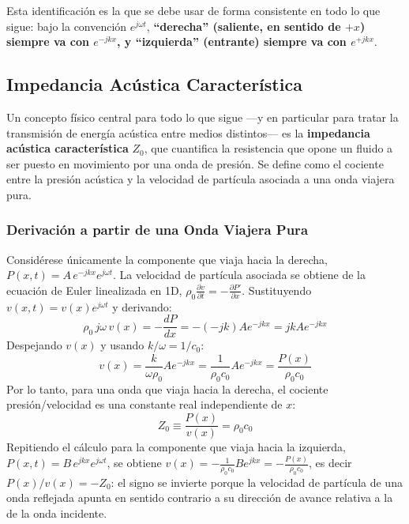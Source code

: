 \documentclass[11pt,letterpaper]{article}
\begin{document}
Esta identificación es la que se debe usar de forma consistente en todo lo que sigue: bajo la convención $e^{j\omega t}$, \textbf{``derecha'' (saliente, en sentido de $+x$) siempre va con $e^{-jkx}$, y ``izquierda'' (entrante) siempre va con $e^{+jkx}$}.

\subsection{Impedancia Acústica Característica}\label{sec:impedancia}

Un concepto físico central para todo lo que sigue —y en particular para tratar la transmisión de energía acústica entre medios distintos— es la \textbf{impedancia acústica característica} $Z_0$, que cuantifica la resistencia que opone un fluido a ser puesto en movimiento por una onda de presión. Se define como el cociente entre la presión acústica y la velocidad de partícula asociada a una onda viajera pura.

\subsubsection{Derivación a partir de una Onda Viajera Pura}
Considérese únicamente la componente que viaja hacia la derecha, $P(x,t) = A\,e^{-jkx}e^{j\omega t}$. La velocidad de partícula asociada se obtiene de la ecuación de Euler linealizada en 1D, $\rho_0\frac{\partial v}{\partial t} = -\frac{\partial P'}{\partial x}$. Sustituyendo $v(x,t)=v(x)e^{j\omega t}$ y derivando:
\begin{equation}
    \rho_0\, j\omega\, v(x) = -\frac{dP}{dx} = -(-jk)A e^{-jkx} = jk A e^{-jkx}
\end{equation}
Despejando $v(x)$ y usando $k/\omega = 1/c_0$:
\begin{equation}
    v(x) = \frac{k}{\omega \rho_0} A e^{-jkx} = \frac{1}{\rho_0 c_0} A e^{-jkx} = \frac{P(x)}{\rho_0 c_0}
\end{equation}
Por lo tanto, para una onda que viaja hacia la derecha, el cociente presión/velocidad es una constante real independiente de $x$:
\begin{equation}
    Z_0 \equiv \frac{P(x)}{v(x)} = \rho_0 c_0
\end{equation}
Repitiendo el cálculo para la componente que viaja hacia la izquierda, $P(x,t)=B\,e^{jkx}e^{j\omega t}$, se obtiene $v(x) = -\frac{1}{\rho_0 c_0}B e^{jkx} = -\frac{P(x)}{\rho_0 c_0}$, es decir $P(x)/v(x) = -Z_0$: el signo se invierte porque la velocidad de partícula de una onda reflejada apunta en sentido contrario a su dirección de avance relativa a la de la onda incidente.
\end{document}
